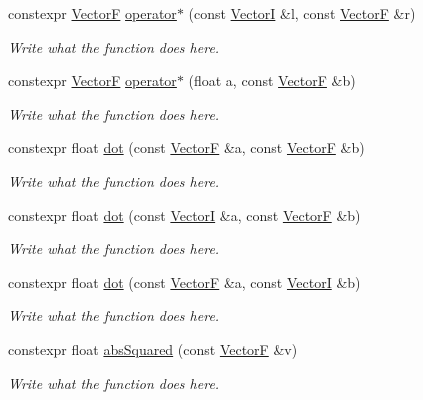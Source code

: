 \begin{DoxyCompactItemize}
constexpr \hyperlink{structVectorF}{Vector\+F} \hyperlink{structVectorF_add4f595c053e3ce987fa2086371af666}{operator$\ast$} (const \hyperlink{structVectorI}{Vector\+I} \&l, const \hyperlink{structVectorF}{Vector\+F} \&r)
\begin{DoxyCompactList}\small\item\em Write what the function does here. \end{DoxyCompactList}\item 
constexpr \hyperlink{structVectorF}{Vector\+F} \hyperlink{structVectorF_a95e18ed3b8a090fd040f5046a03682b9}{operator$\ast$} (float a, const \hyperlink{structVectorF}{Vector\+F} \&b)
\begin{DoxyCompactList}\small\item\em Write what the function does here. \end{DoxyCompactList}\item 
constexpr float \hyperlink{structVectorF_ae6a81a095a040050d82332d33b63b80d}{dot} (const \hyperlink{structVectorF}{Vector\+F} \&a, const \hyperlink{structVectorF}{Vector\+F} \&b)
\begin{DoxyCompactList}\small\item\em Write what the function does here. \end{DoxyCompactList}\item 
constexpr float \hyperlink{structVectorF_a5af45b716dd71b2e16c2c51cf451f4a9}{dot} (const \hyperlink{structVectorI}{Vector\+I} \&a, const \hyperlink{structVectorF}{Vector\+F} \&b)
\begin{DoxyCompactList}\small\item\em Write what the function does here. \end{DoxyCompactList}\item 
constexpr float \hyperlink{structVectorF_ac52ea832e6d54952f02b1d513e886993}{dot} (const \hyperlink{structVectorF}{Vector\+F} \&a, const \hyperlink{structVectorI}{Vector\+I} \&b)
\begin{DoxyCompactList}\small\item\em Write what the function does here. \end{DoxyCompactList}\item 
constexpr float \hyperlink{structVectorF_a1536c33d14bb5c290322c504e0f734b7}{abs\+Squared} (const \hyperlink{structVectorF}{Vector\+F} \&v)
\begin{DoxyCompactList}\small\item\em Write what the function does here. \end{DoxyCompactList}\item 

\end{DoxyCompactItemize}
